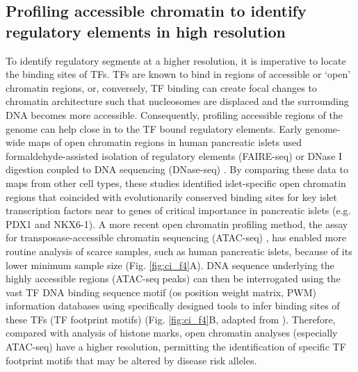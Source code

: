 \subsection{Profiling accessible chromatin to identify regulatory elements in high resolution}
To identify regulatory segments at a higher resolution, it is imperative to locate the binding sites of TFs. TFs are known to bind in regions of accessible or ‘open’ chromatin regions, or, conversely, TF binding can create focal changes to chromatin architecture such that nucleosomes are displaced and the surrounding DNA becomes more accessible. Consequently, profiling accessible regions of the genome can help close in to the TF bound regulatory elements. Early genome-wide maps of open chromatin regions in human pancreatic islets used formaldehyde-assisted isolation of regulatory elements (FAIRE-seq) \cite{gaultonMapOpenChromatin2010} or DNase I digestion coupled to DNA sequencing (DNase-seq) \cite{stitzelGlobalEpigenomicAnalysis2010}. By comparing these data to maps from other cell types, these studies identified islet-specific open chromatin regions that coincided with evolutionarily conserved binding sites for key islet transcription factors near to genes of critical importance in pancreatic islets (e.g. PDX1 and NKX6-1). A more recent open chromatin profiling method, the assay for transposase-accessible chromatin sequencing (ATAC-seq) \cite{buenrostroATACseqMethodAssaying2015}, has enabled more routine analysis of scarce samples, such as human pancreatic islets, because of its lower minimum sample size (Fig. \ref{fig:ci_f4}A). DNA sequence underlying the highly accessible regions (ATAC-seq peaks) can then be interrogated using the vast TF DNA binding sequence motif (os position weight matrix, PWM) information databases \cite{kheradpourSystematicDiscoveryCharacterization2014, mathelierJASPAR2014Extensively2014,sandelinJASPAROpenaccessDatabase2004,jolmaDNABindingSpecificitiesHuman2013} using specifically designed tools \cite{pique-regiAccurateInferenceTranscription2011} to infer binding sites of these TFs (TF footprint motifs) (Fig. \ref{fig:ci_f4}B, adapted from \cite{kyonoGenomicAnnotationDiseaseassociated2019}). Therefore, compared with analysis of histone marks, open chromatin analyses (especially ATAC-seq) have a higher resolution, permitting the identification of specific TF footprint motifs that may be altered by disease risk alleles. 



